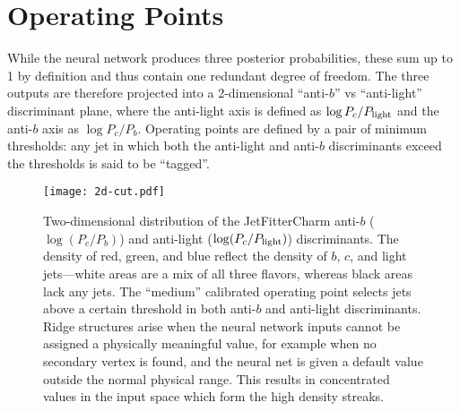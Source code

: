 \section{Operating Points}

While the neural network produces three posterior probabilities, these sum up to 1 by definition and thus contain one redundant degree of freedom. The three outputs are therefore projected into a 2-dimensional ``anti-$b$'' vs ``anti-light'' discriminant plane, where the anti-light axis is defined as $\log P_{c} / P_{\rm light}$ and the anti-$b$ axis as $\log P_{c} / P_{b}$. Operating points are defined by a pair of minimum thresholds: any jet in which both the anti-light and anti-$b$ discriminants exceed the thresholds is said to be ``tagged''.
\begin{figure}
  \begin{center}
  \texttt{[image: 2d-cut.pdf]}
  \caption[JetFitterCharm 2-dimensional cut plane]{
Two-dimensional distribution of the JetFitterCharm anti-$b$ ($\log(P_c/P_b)$) and anti-light ($\log(P_c/P_{\rm light})$) discriminants. The density of red, green, and blue reflect the density of $b$, $c$, and light jets---white areas are a mix of all three flavors, whereas black areas lack any jets. The ``medium'' calibrated operating point selects jets above a certain threshold in both anti-$b$ and anti-light discriminants. Ridge structures arise when the neural network inputs cannot be assigned a physically meaningful value, for example when no secondary vertex is found, and the neural net is given a default value outside the normal physical range. This results in concentrated values in the input space which form the high density streaks.}
  \label{tag:fig:2dcut}
  \end{center}
\end{figure}

